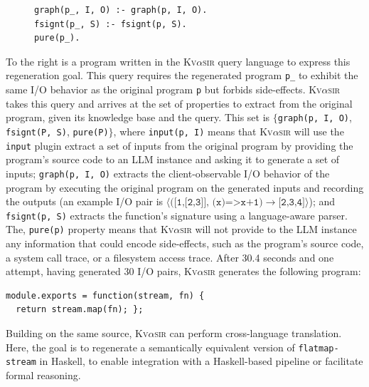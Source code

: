 \documentclass[nonacm,sigplan]{acmart}
\newcommand{\sys}{{\scshape Kv{$\alpha$}sir}\xspace}
\newcommand{\ttt}[1]{\texttt{#1}\xspace}
\begin{document}
\begin{figure}
\vspace{-10pt}
\hspace{-10pt}
\begin{verbatim}
graph(p_, I, O) :- graph(p, I, O).
fsignt(p_, S) :- fsignt(p, S).
pure(p_).
\end{verbatim}
\end{figure}
To the right is a program written in the \sys query language to express 
this regeneration goal.
This query requires the regenerated program \ttt{p\_} to exhibit the same I/O behavior as the original program \ttt{p}
but forbids side-effects.
\sys takes this query and arrives at the set of properties to extract from the
original program, given its knowledge base and the query.
This set is $\{$\ttt{graph(p, I, O)}, \ttt{fsignt(P, S)}, \ttt{pure(P)}$\}$, where
\ttt{input(p, I)} means that \sys will use the \ttt{input} plugin extract a set of inputs from the original program
by providing the program's source code to an LLM instance and asking it to generate a set of inputs;
\ttt{graph(p, I, O)} extracts the client-observable I/O behavior of the program
by executing the original program on the generated inputs and recording the outputs
(an example I/O pair is $\langle\ttt{([1,[2,3]], (x)=>x+1)}\to\ttt{[2,3,4]}\rangle$);
and \ttt{fsignt(p, S)} extracts the function's signature using a language-aware parser.
The, \ttt{pure(p)} property means that \sys will not provide to the LLM 
instance any information that could encode side-effects, such as the
program's source code, a system call trace, or a filesystem access trace.
After 30.4 seconds and one attempt, having generated 30 I/O pairs, \sys generates the following program:
\begin{verbatim}
module.exports = function(stream, fn) {
  return stream.map(fn); };
\end{verbatim}

Building on the same source, \sys can perform cross-language
translation. 
Here, the goal is to regenerate a semantically equivalent version
of \ttt{flatmap-stream} in Haskell, to enable integration with a
Haskell-based pipeline or facilitate formal reasoning.
\end{document}
